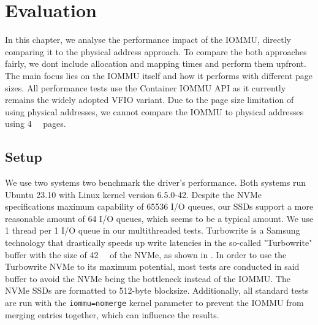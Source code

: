 \chapter{Evaluation}
In this chapter, we analyse the performance impact of the IOMMU, directly comparing it to the physical address approach. To compare the both approaches fairly, we dont include allocation and mapping times and perform them upfront. The main focus lies on the IOMMU itself and how it performs with different page sizes. All performance tests use the Container IOMMU API as it currently remains the widely adopted VFIO variant.
Due to the page size limitation of using physical addresses, we cannot compare the IOMMU to physical addresses using \qty{4}{\kibi\byte} pages.

\section{Setup}
We use two systems two benchmark the driver's performance.
Both systems run Ubuntu 23.10 with Linux kernel version 6.5.0-42.
Despite the NVMe specifications maximum capability of 65536 I/O queues, our SSDs support a more reasonable amount of 64 I/O queues, which seems to be a typical amount.
We use 1 thread per 1 I/O queue in our multithreaded tests. Turbowrite is a Samsung technology that drastically speeds up write latencies in the so-called "Turbowrite" buffer with the size of \qty{42}{\giga\byte} of the NVMe, as shown in \cite{vroom}. In order to use the Turbowrite NVMe to its maximum potential, most tests are conducted in said buffer to avoid the NVMe being the bottleneck instead of the IOMMU.
The NVMe SSDs are formatted to 512-byte blocksize.
Additionally, all standard tests are run with the \texttt{iommu=nomerge} kernel parameter to prevent the IOMMU from merging entries together, which can influence the results.

